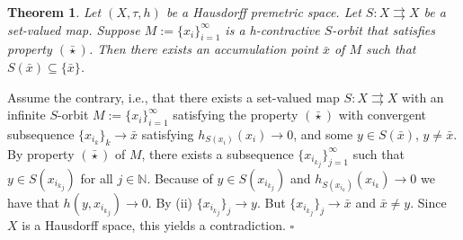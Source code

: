 \documentclass{article}
\newcommand{\N}{\mathbb{N}}
\renewenvironment{proof}
         {\begin{trivlist}\item[
         {\bf Proof.}]}{{\hfill $\square$} \end{trivlist}}
\newtheorem{theo}{Theorem}[section]
\newtheorem{prop}[theo]{Proposition}
\begin{document}
\begin{theo} \label{strong_point}Let $(X, \tau, h)$ be a Hausdorff premetric space. Let $S: X \rightrightarrows X$ be a set-valued map. Suppose $M:=\{x_i\}_{i=1}^{\infty}$ is a h-contractive $S$-orbit that satisfies property  $(\bar{\star})$. Then there exists an accumulation point $\bar{x}$ of $M$ such that $S(\bar{x}) \subseteq \{\bar{x}\}$.
\end{theo}
\begin{proof} 
Assume the contrary, i.e., that there exists a set-valued map $S:X\rightrightarrows X$ with an infinite $S$-orbit $M:=\{x_i\}_{i=1}^{\infty}$ satisfying the property $(\bar{\star})$ with convergent subsequence $\{x_{i_k}\}_k \rightarrow \bar{x}$ satisfying $h_{S(x_i)}(x_i) \rightarrow 0$, and some $y\in S(\bar{x})$, $y\neq \bar{x}$. By property $(\bar{\star})$ of $M$, there exists a subsequence $\{x_{{i_k}_j}\}_{j=1}^{\infty}$ such that $y\in S(x_{{i_k}_j})$ for all $j\in \N$. Because of $y\in S(x_{{i_k}_j})$ and $h_{S(x_{i_k})}(x_{i_k}) \rightarrow 0$ we have that $h(y,x_{{i_k}_j}) \rightarrow 0$. By (ii)  $\{x_{{i_k}_j}\}_j\to y$. But  $\{x_{{i_k}_j}\}_j\to \bar{x}$ and $\bar{x} \neq y$. Since $X$ is a Hausdorff space, this yields a contradiction.
\end{proof}


\end{document}
